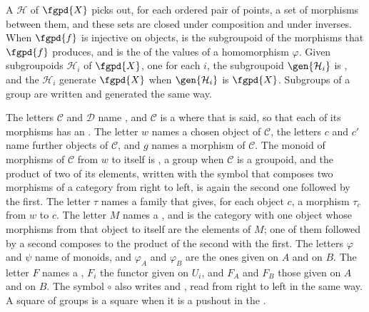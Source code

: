 A  $\mathcal{H}$ of $\fgpd{X}$
picks out, for each ordered pair of points, a set of morphisms between them, and
these sets are closed under composition and under inverses.  When $\fgpd{f}$ is
injective on objects, 
is the subgroupoid of the morphisms that $\fgpd{f}$ produces, and
 is the 
of the values of a homomorphism $\varphi$.  Given subgroupoids $\mathcal{H}_{i}$
of $\fgpd{X}$, one for each $i$, the subgroupoid $\gen{\mathcal{H}_{i}}$ is
, and the
$\mathcal{H}_{i}$ generate $\fgpd{X}$ when $\gen{\mathcal{H}_{i}}$ is
$\fgpd{X}$.  Subgroups of a group are written and generated the same way.

The letters $\mathcal{C}$ and $\mathcal{D}$ name
, and $\mathcal{C}$ is a
 where that is said, so that each of
its morphisms has an .  The letter $w$
names a chosen object of $\mathcal{C}$, the letters $c$ and $c'$ name further
objects of $\mathcal{C}$, and $g$ names a morphism of $\mathcal{C}$.  The monoid
of morphisms of $\mathcal{C}$ from $w$ to itself is
, a group when $\mathcal{C}$ is a
groupoid, and the product of two of its elements, written with the symbol
 that composes two
morphisms of a category from right to left, is again the second one followed by
the first.  The letter $\tau$ names a family that gives, for each
object $c$, a morphism $\tau_{c}$ from $w$ to $c$.  The letter $M$ names a
, and 
is the category with one object whose morphisms from that object to itself are
the elements of $M$; one of them followed by a second composes to the product of
the second with the first.  The letters $\varphi$ and $\psi$ name
 of monoids, and $\varphi_{A}$ and
$\varphi_{B}$ are the ones given on $A$ and on $B$.  The letter $F$ names a
, $F_{i}$ the functor given on
$U_{i}$, and $F_{A}$ and $F_{B}$ those given on $A$ and on $B$.  The symbol
$\circ$ also writes  and ,
read from right to left in the same way.  A square of
groups is a  square when it is a
pushout in the .

